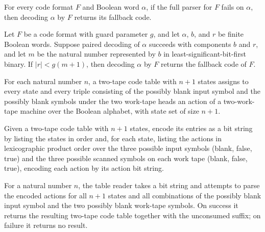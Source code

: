 \begin{theorem}
\label{Turing.CodeFormat.decode_of_parseFull_none}
\leanok
{}
For every code format $F$ and Boolean word $\alpha$, if the full parser for $F$ fails on
$\alpha$, then decoding $\alpha$ by $F$ returns its fallback code.
\end{theorem}

\begin{theorem}
\label{Turing.CodeFormat.decode_of_guard_lt}
\leanok
{}
Let $F$ be a code format with guard parameter $g$, and let $\alpha$, $b$, and $r$ be
finite Boolean words. Suppose paired decoding of $\alpha$ succeeds with components $b$
and $r$, and let $m$ be the natural number represented by $b$ in
least-significant-bit-first binary. If $|r| < g(m+1)$, then decoding $\alpha$ by $F$
returns the fallback code of $F$.
\end{theorem}

\begin{definition}
\label{Turing.CodeTable2}
\leanok
{}
For each natural number $n$, a two-tape code table with $n+1$ states assigns to every
state and every triple consisting of the possibly blank input symbol and the possibly
blank symbols under the two work-tape heads an action of a two-work-tape machine over
the Boolean alphabet, with state set of size $n+1$.
\end{definition}

\begin{definition}
\label{Turing.codeTable2Bits}
\leanok
{}
Given a two-tape code table with $n+1$ states, encode its entries as a bit string by
listing the states in order and, for each state, listing the actions in lexicographic
product order over the three possible input symbols (blank, false, true) and the three
possible scanned symbols on each work tape (blank, false, true), encoding each action by
its action bit string.
\end{definition}

\begin{definition}
\label{Turing.codeReadTable2}
\leanok
{}
For a natural number $n$, the table reader takes a bit string and attempts to parse the
encoded actions for all $n+1$ states and all combinations of the possibly blank input
symbol and the two possibly blank work-tape symbols. On success it returns the resulting
two-tape code table together with the unconsumed suffix; on failure it returns no
result.
\end{definition}

